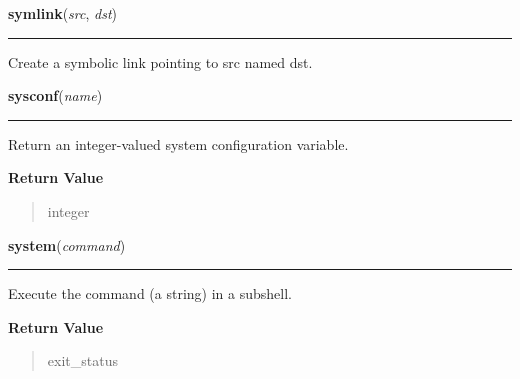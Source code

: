 \hspace{.8\funcindent}\begin{boxedminipage}{\funcwidth}

    \raggedright \textbf{symlink}(\textit{src}, \textit{dst})

    \vspace{-1.5ex}

    \rule{\textwidth}{0.5\fboxrule}
\setlength{\parskip}{2ex}
    Create a symbolic link pointing to src named dst.

\setlength{\parskip}{1ex}
    \end{boxedminipage}

    \label{os:sysconf}

    \vspace{0.5ex}

\hspace{.8\funcindent}\begin{boxedminipage}{\funcwidth}

    \raggedright \textbf{sysconf}(\textit{name})

    \vspace{-1.5ex}

    \rule{\textwidth}{0.5\fboxrule}
\setlength{\parskip}{2ex}
    Return an integer-valued system configuration variable.

\setlength{\parskip}{1ex}
      \textbf{Return Value}
    \vspace{-1ex}

      \begin{quote}
      integer

      \end{quote}

    \end{boxedminipage}

    \label{os:system}

    \vspace{0.5ex}

\hspace{.8\funcindent}\begin{boxedminipage}{\funcwidth}

    \raggedright \textbf{system}(\textit{command})

    \vspace{-1.5ex}

    \rule{\textwidth}{0.5\fboxrule}
\setlength{\parskip}{2ex}
    Execute the command (a string) in a subshell.

\setlength{\parskip}{1ex}
      \textbf{Return Value}
    \vspace{-1ex}

      \begin{quote}
      exit\_status

      \end{quote}

    \end{boxedminipage}

